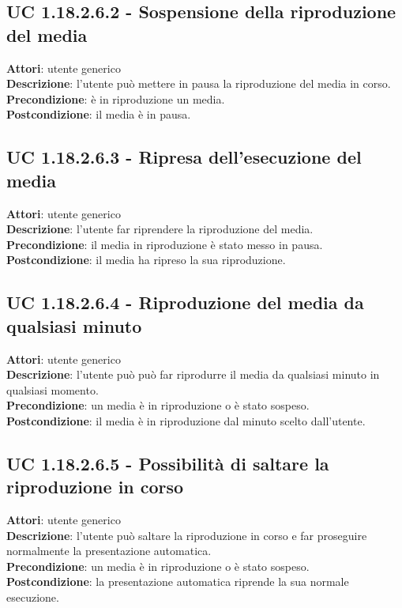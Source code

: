 	\subsection{UC 1.18.2.6.2 - Sospensione della riproduzione del media}{
		\label{uc1.18.2.6.2}
		\textbf{Attori}: utente generico \\
		\textbf{Descrizione}: l'utente può mettere in pausa la riproduzione del media in corso. \\
		\textbf{Precondizione}: è in riproduzione un media.	\\
		\textbf{Postcondizione}: il media è in pausa.	\\
	}
	\subsection{UC 1.18.2.6.3 - Ripresa dell'esecuzione del media}{
		\label{uc1.18.2.6.3}
		\textbf{Attori}: utente generico \\
		\textbf{Descrizione}: l'utente far riprendere la riproduzione del media. \\
		\textbf{Precondizione}: il media in riproduzione è stato messo in pausa.	\\
		\textbf{Postcondizione}: il media ha ripreso la sua riproduzione.	\\
	}
	\subsection{UC 1.18.2.6.4 - Riproduzione del media da qualsiasi minuto}{
		\label{uc1.18.2.6.4}
		\textbf{Attori}: utente generico \\
		\textbf{Descrizione}: l'utente può può far riprodurre il media da qualsiasi minuto in qualsiasi momento. \\
		\textbf{Precondizione}: un media è in riproduzione o è stato sospeso.	\\
		\textbf{Postcondizione}: il media è in riproduzione dal minuto scelto dall'utente.	\\
	}
	\subsection{UC 1.18.2.6.5 - Possibilità di saltare la riproduzione in corso}{
		\label{uc1.18.2.6.5}
		\textbf{Attori}: utente generico \\
		\textbf{Descrizione}: l'utente può saltare la riproduzione in corso e far proseguire normalmente la presentazione automatica. \\
		\textbf{Precondizione}: un media è in riproduzione o è stato sospeso.	\\
		\textbf{Postcondizione}: la presentazione automatica riprende la sua normale esecuzione.	\\
	}
